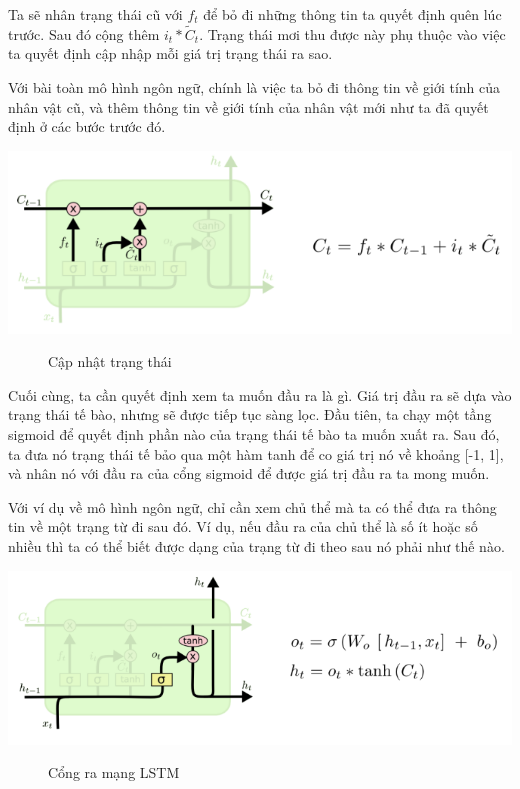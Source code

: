 Ta sẽ nhân trạng thái cũ với $f_{t}$ để bỏ đi những thông tin ta quyết định quên lúc trước. Sau đó cộng thêm $i_{t} * \widetilde{C}_{t}$. Trạng thái mơi thu được này phụ thuộc vào việc ta quyết định cập nhập mỗi giá trị trạng thái ra sao.

Với bài toàn mô hình ngôn ngữ, chính là việc ta bỏ đi thông tin về giới tính của nhân vật cũ, và thêm thông tin về giới tính của nhân vật mới như ta đã quyết định ở các bước trước đó.
\begin{center}
    \includegraphics[scale=.5]{image/chapter6/bt3.png}
    \begin{figure}[htp]
    \begin{center}
     
    \end{center}
    \caption{Cập nhật trạng thái}
    \end{figure}
\end{center}
Cuối cùng, ta cần quyết định xem ta muốn đầu ra là gì. Giá trị đầu ra sẽ dựa vào trạng thái tế bào, nhưng sẽ được tiếp tục sàng lọc. Đầu tiên, ta chạy một tầng sigmoid để quyết định phần nào của trạng thái tế bào ta muốn xuất ra. Sau đó, ta đưa nó trạng thái tế bảo qua một hàm tanh để co giá trị nó về khoảng [-1, 1], và nhân nó với đầu ra của cổng sigmoid để được giá trị đầu ra ta mong muốn.

Với ví dụ về mô hình ngôn ngữ, chỉ cần xem chủ thể mà ta có thể đưa ra thông tin về một trạng từ đi sau đó. Ví dụ, nếu đầu ra của chủ thể là số ít hoặc số nhiều thì ta có thể biết được dạng của trạng từ đi theo sau nó phải như thế nào.
\begin{center}
    \includegraphics[scale=.5]{image/chapter6/bt4.png}
    \begin{figure}[htp]
    \begin{center}
     
    \end{center}
    \caption{Cổng ra mạng LSTM}
    \end{figure}
\end{center}


